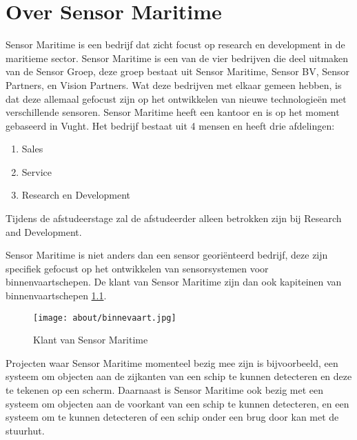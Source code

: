 \chapter{Over Sensor Maritime}
Sensor Maritime is een bedrijf dat zicht focust op research en development in de maritieme sector. Sensor Maritime is een van de vier bedrijven die deel uitmaken van de Sensor Groep, deze groep bestaat uit Sensor Maritime, Sensor BV, Sensor Partners, en Vision Partners. Wat deze bedrijven met elkaar gemeen hebben, is dat deze allemaal gefocust zijn op het ontwikkelen van nieuwe technologieën met verschillende sensoren. Sensor Maritime heeft een kantoor en is op het moment gebaseerd in Vught. Het bedrijf bestaat uit 4 mensen en heeft drie afdelingen:
\begin{enumerate}
	\item Sales
	\item Service
	\item Research en Development
\end{enumerate}
Tijdens de afstudeerstage zal de afstudeerder alleen betrokken zijn bij Research and Development.
\newline

\noindent Sensor Maritime is niet anders dan een sensor georiënteerd bedrijf, deze zijn specifiek gefocust op het ontwikkelen van sensorsystemen voor binnenvaartschepen. De klant van Sensor Maritime zijn dan ook kapiteinen van binnenvaartschepen \ref{fig:customer_sensor_maritime}.
\begin{figure}[h!]

	\centering
	\caption{Klant van Sensor Maritime}
	\label{fig:customer_sensor_maritime}
	\texttt{[image: about/binnevaart.jpg]}
	

\end{figure}

\noindent Projecten waar Sensor Maritime momenteel bezig mee zijn is bijvoorbeeld, een systeem om objecten aan de zijkanten van een schip te kunnen detecteren en deze te tekenen op een scherm. Daarnaast is Sensor Maritime ook bezig met een systeem om objecten aan de voorkant van een schip te kunnen detecteren, en een systeem om te kunnen detecteren of een schip onder een brug door kan met de stuurhut.
